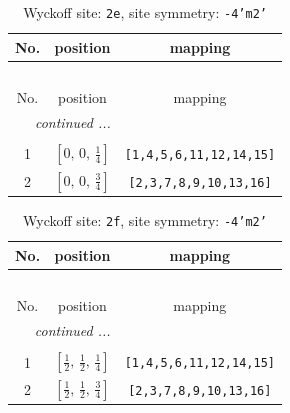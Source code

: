 \documentclass[fleqn,8pt]{jsarticle}
\begin{document}
\begin{longtable}{ccc}
\caption{Wyckoff site: {\tt 2e}, site symmetry: {\tt -4'm2'}}
 \\
 \hline \hline
No. & position & mapping \\ \hline \endfirsthead

\multicolumn{2}{l}{\tablename\ \thetable{}} \\
 \hline \hline
No. & position & mapping \\ \hline \endhead

 \hline \hline
\multicolumn{2}{r}{\footnotesize\it continued ...} \\ \endfoot

 \hline \hline
\multicolumn{2}{r}{} \\ \endlastfoot

1 & $\left[ 0,\, 0,\, \frac{1}{4} \right]$ & {\tt [1,4,5,6,11,12,14,15]} \\ \hline
2 & $\left[ 0,\, 0,\, \frac{3}{4} \right]$ & {\tt [2,3,7,8,9,10,13,16]} \\
\end{longtable}
\renewcommand{\arraystretch}{1.2}
\begin{longtable}{ccc}
\caption{Wyckoff site: {\tt 2f}, site symmetry: {\tt -4'm2'}}
 \\
 \hline \hline
No. & position & mapping \\ \hline \endfirsthead

\multicolumn{2}{l}{\tablename\ \thetable{}} \\
 \hline \hline
No. & position & mapping \\ \hline \endhead

 \hline \hline
\multicolumn{2}{r}{\footnotesize\it continued ...} \\ \endfoot

 \hline \hline
\multicolumn{2}{r}{} \\ \endlastfoot

1 & $\left[ \frac{1}{2},\, \frac{1}{2},\, \frac{1}{4} \right]$ & {\tt [1,4,5,6,11,12,14,15]} \\ \hline
2 & $\left[ \frac{1}{2},\, \frac{1}{2},\, \frac{3}{4} \right]$ & {\tt [2,3,7,8,9,10,13,16]} \\
\end{longtable}
\renewcommand{\arraystretch}{1.2}
\end{document}
